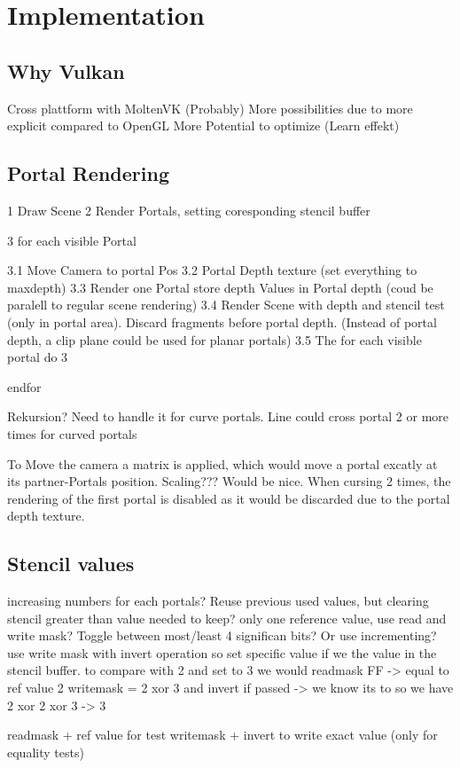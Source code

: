 \section{Implementation}
\subsection{Why Vulkan}
Cross plattform with MoltenVK
(Probably) More possibilities due to more explicit compared to OpenGL
More Potential to optimize
(Learn effekt)

\subsection{Portal Rendering}
1 Draw Scene
2 Render Portals, setting coresponding stencil buffer

3 for each visible Portal

3.1 Move Camera to portal Pos
3.2 Portal Depth texture (set everything to maxdepth)
3.3 Render one Portal store depth Values in Portal depth (coud be paralell to regular scene rendering)
3.4 Render Scene with depth and stencil test (only in portal area). Discard fragments before portal depth.
(Instead of portal depth, a clip plane could be used for planar portals)
3.5 The for each visible portal do 3

endfor

Rekursion? Need to handle it for curve portals. Line could cross portal 2 or more times for curved portals


To Move the camera a matrix is applied, which would move a portal excatly at its partner-Portals position. Scaling??? Would be nice.
When cursing 2 times, the rendering of the first portal is disabled as it would be discarded due to the portal depth texture.

\subsection{Stencil values}
increasing numbers for each portals?
Reuse previous used values, but clearing stencil greater than value needed to keep?
only one reference value, use read and write mask? Toggle between most/least 4 significan bits? Or use incrementing?
use write mask with invert operation so set specific value if we the value in the stencil buffer.
to compare with 2 and set to 3 we would
readmask FF -> equal to ref value 2
writemask = 2 xor 3 and invert if passed -> we know its to so we have 2 xor 2 xor 3 -> 3

readmask + ref value for test
writemask + invert to write exact value (only for equality tests)

